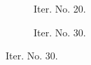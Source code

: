 \documentclass[a4paper,12pt]{amsart}
\numberwithin{equation}{section}
\begin{document}
\begin{figure}[h!]
\begin{subfigure}[t]{0.49\textwidth}
    \caption{Iter. No. 20.}
\end{subfigure}
	\hfill
\begin{subfigure}[t]{0.49\textwidth}
    \caption{Iter. No. 30.}
\end{subfigure}


\end{figure}
\end{document}
